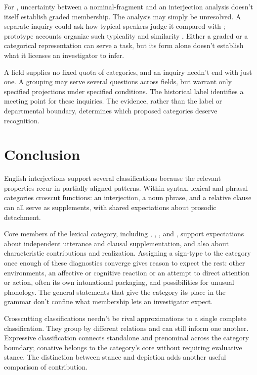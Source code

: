 \documentclass[12pt]{article}
\begin{document}
For , uncertainty between a nominal-fragment and an
interjection analysis doesn't itself establish graded membership. The
analysis may simply be unresolved. A separate inquiry could ask how
typical speakers judge it compared with ; prototype
accounts organize such typicality and similarity \citep{rosch1975,taylor2003}.
Either a graded or a categorical representation can serve a task,
but its form alone doesn't establish what it licenses an investigator
to infer.

A field supplies no fixed quota of categories, and an inquiry
needn't end with just one. A grouping may serve several questions across
fields, but warrant only specified projections under specified conditions.
The historical label  identifies a meeting point for
these inquiries. The evidence, rather than the label or departmental
boundary, determines which proposed categories deserve recognition.

\section{Conclusion}\label{sec:conclusion}

English interjections support several classifications because the relevant
properties recur in partially aligned patterns. Within syntax, lexical
and phrasal categories crosscut functions: an interjection, a noun phrase,
and a relative clause can all serve as supplements, with shared
expectations about prosodic detachment.

Core members of the lexical category, including ,
, , and , support expectations
about independent utterance and clausal supplementation, and also about
characteristic contributions and realization. Assigning a sign-type to the
category once enough of these diagnostics converge gives reason to expect
the rest: other environments, an affective or cognitive reaction
or an attempt to direct attention or action, often its own intonational
packaging, and possibilities for unusual phonology.
The general statements that give the category its place in the grammar
don't confine what membership lets an investigator expect.

Crosscutting classifications needn't be rival approximations to a single
complete classification. They group by different relations and can
still inform one another. Expressive classification connects standalone and
prenominal  across the category boundary; conative
 belongs to the category's core without requiring evaluative
stance. The distinction between stance and depiction adds another
useful comparison of contribution.
\end{document}
